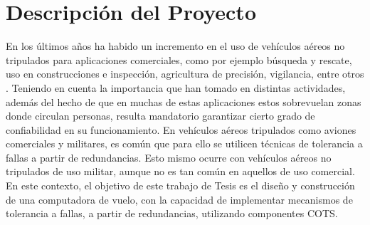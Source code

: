 \section{Descripción del Proyecto}





En los últimos años ha habido un incremento en el uso de vehículos aéreos no tripulados para aplicaciones comerciales, como por ejemplo búsqueda y rescate, uso en construcciones e inspección, agricultura de precisión, vigilancia, entre otros \cite{8682048}. Teniendo en cuenta la importancia que han tomado en distintas actividades, además del hecho de que en muchas de estas aplicaciones estos sobrevuelan zonas donde circulan personas, resulta mandatorio garantizar cierto grado de confiabilidad en su funcionamiento. En vehículos aéreos tripulados como aviones comerciales y militares, es común que para ello se utilicen técnicas de tolerancia a fallas a partir de redundancias. Esto mismo ocurre con vehículos aéreos no tripulados de uso militar, aunque no es tan común en aquellos de uso comercial.\\

En este contexto, el objetivo de este trabajo de Tesis es el diseño y construcción de una computadora de vuelo, con la capacidad de implementar mecanismos de tolerancia a fallas, a partir de redundancias, utilizando componentes COTS.